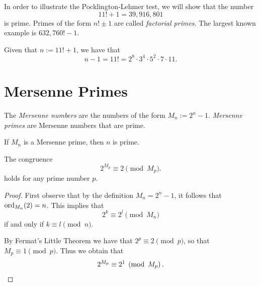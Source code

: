 \begin{example}
  In order to illustrate the Pocklington-Lehmer test, we will show that the number
  \begin{equation*}
    11!+1 = 39,916,801
  \end{equation*}
  is prime. Primes of the form $n!\pm 1$ are called \emph{factorial primes}. The largest known example is $632,760!-1$.

  Given that $n:=11!+1$, we have that
  \begin{equation*}
    n-1=11!=2^8\cdot 3^4\cdot 5^2\cdot 7\cdot 11.
  \end{equation*}
  
\end{example}

\section{Mersenne Primes}

\begin{definition}
  The \emph{Mersenne numbers} are the numbers of the form $M_n:= 2^n-1$. \emph{Mersenne primes} are Mersenne numbers that are prime. 
\end{definition}

\begin{proposition}
  If $M_n$ is a Mersenne prime, then $n$ is prime.
\end{proposition}

\begin{lemma}\label{lemma:base-2-probable-prime}
  The congruence
  \begin{equation*}
    2^{M_p}\equiv 2\pmod{M_p}.
  \end{equation*}
  holds for any prime number $p$.
\end{lemma}

\begin{proof}
  First observe that by the definition $M_n=2^n-1$, it follows that $\ord_{M_n}(2)= n$. This implies that
  \begin{equation*}
    2^k\equiv 2^l\pmod{M_n}
  \end{equation*}
  if and only if $k\equiv l\pmod{n}$.

  By Fermat's Little Theorem we have that $2^p\equiv 2\pmod{p}$, so that $M_p\equiv 1\pmod{p}$. Thus we obtain that
  \begin{equation*}
    2^{M_p}\equiv 2^1\pmod{M_p}.\qedhere
  \end{equation*}
\end{proof}


